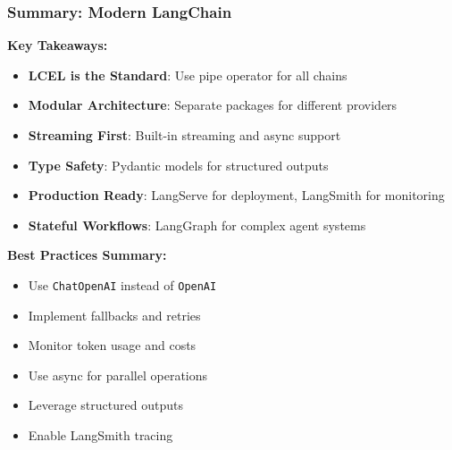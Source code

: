 \begin{frame}\frametitle{Summary: Modern LangChain}

\textbf{Key Takeaways:}
\begin{itemize}
\item \textbf{LCEL is the Standard}: Use pipe operator for all chains
\item \textbf{Modular Architecture}: Separate packages for different providers
\item \textbf{Streaming First}: Built-in streaming and async support
\item \textbf{Type Safety}: Pydantic models for structured outputs
\item \textbf{Production Ready}: LangServe for deployment, LangSmith for monitoring
\item \textbf{Stateful Workflows}: LangGraph for complex agent systems
\end{itemize}

\textbf{Best Practices Summary:}
\begin{itemize}
\item Use \texttt{ChatOpenAI} instead of \texttt{OpenAI}
\item Implement fallbacks and retries
\item Monitor token usage and costs
\item Use async for parallel operations
\item Leverage structured outputs
\item Enable LangSmith tracing
\end{itemize}

\end{frame}

